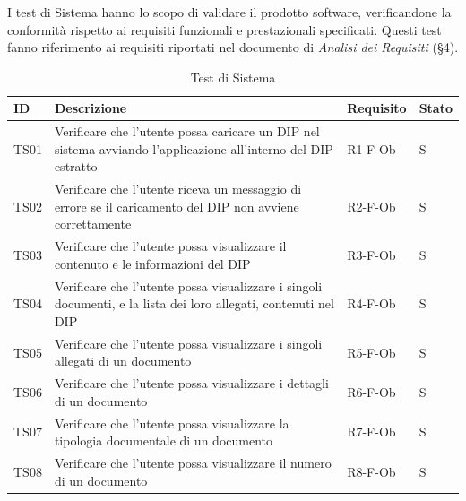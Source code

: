 \documentclass[a4paper,12pt]{article}
\begin{document}
        I test di Sistema hanno lo scopo di validare il prodotto software, verificandone la conformità rispetto ai requisiti funzionali e prestazionali specificati.
        Questi test fanno riferimento ai requisiti riportati nel documento di \textit{Analisi dei Requisiti} (\S4).

            \begin{longtable}{|M{1.2cm}|M{6.3cm}|M{2.5cm}|M{1.5cm}|}
                
                \caption{Test di Sistema} \\
                \hline
                \textbf{ID} & \textbf{Descrizione} & \textbf{Requisito} & \textbf{Stato} \\
                \hline
                \endhead

                TS01 & Verificare che l’utente possa caricare un DIP nel sistema avviando l’applicazione all’interno del DIP estratto & R1-F-Ob & S \\
                \hline

                TS02 & Verificare che l’utente riceva un messaggio di errore se il caricamento del DIP non avviene correttamente & R2-F-Ob & S \\
                \hline

                TS03 & Verificare che l’utente possa visualizzare il contenuto e le informazioni del DIP & R3-F-Ob & S \\
                \hline

                TS04 & Verificare che l’utente possa visualizzare i singoli documenti, e la lista dei loro allegati, contenuti nel DIP & R4-F-Ob & S \\
                \hline

                TS05 & Verificare che l’utente possa visualizzare i singoli allegati di un documento & R5-F-Ob & S \\
                \hline

                TS06 & Verificare che l’utente possa visualizzare i dettagli di un documento & R6-F-Ob & S \\
                \hline

                TS07 & Verificare che l’utente possa visualizzare la tipologia documentale di un documento & R7-F-Ob & S \\
                \hline

                TS08 & Verificare che l’utente possa visualizzare il numero di un documento & R8-F-Ob & S \\
                \hline


\end{longtable}
\end{document}
